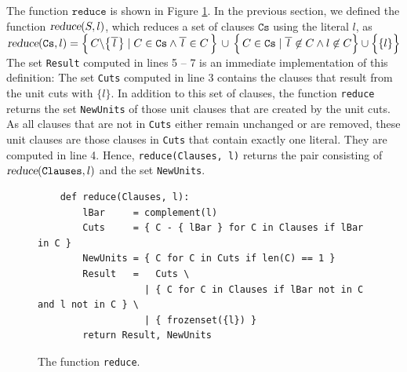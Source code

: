The function $\texttt{reduce}$  is shown in Figure \ref{fig:reduce}.
In the previous section, we defined the function $\textsl{reduce}(S, l)$, which reduces a
set of clauses $\texttt{Cs}$ using the literal $l$, as
\\[0.2cm]
\hspace*{1.3cm}
$\textsl{reduce}(\texttt{Cs},l)  = 
 \Bigl\{\, C \backslash \bigl\{\overline{\,l\,}\bigr\} \;|\; C \in \texttt{Cs} \wedge \overline{\,l\,} \in C \,\Bigr\} 
       \,\cup\, \Bigl\{\, C \in \texttt{Cs} \mid \overline{\,l\,} \not\in C \wedge l \not\in C \Bigr\} \cup \Bigl\{\{l\}\Bigr\}
$
\\[0.2cm]
The set \texttt{Result} computed in lines 5 -- 7 is an immediate implementation of this definition:  The set \texttt{Cuts}
computed in line 3 contains the clauses that result from the unit cuts with $\{l\}$.  In addition to this set of
clauses, the function \texttt{reduce} returns the set \texttt{NewUnits} of those unit clauses that are created by
the unit cuts.  As all clauses that are not in \texttt{Cuts} either remain unchanged or are removed, these unit
clauses are those clauses in \texttt{Cuts} that contain exactly one literal.  They are computed in line 4.  Hence,
\texttt{reduce(Clauses, l)} returns the pair consisting of $\textsl{reduce}(\texttt{Clauses},l)$ and the set
\texttt{NewUnits}.

\begin{figure}[!ht]
  \centering
\begin{verbatim}
    def reduce(Clauses, l):
        lBar     = complement(l)
        Cuts     = { C - { lBar } for C in Clauses if lBar in C }
        NewUnits = { C for C in Cuts if len(C) == 1 }
        Result   =   Cuts \
                   | { C for C in Clauses if lBar not in C and l not in C } \
                   | { frozenset({l}) }
        return Result, NewUnits
\end{verbatim}
\vspace*{-0.3cm}
  \caption{The function \texttt{reduce}. }
  \label{fig:reduce}
\end{figure} 



